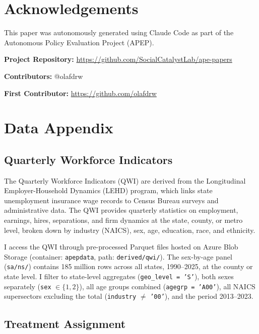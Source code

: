 \documentclass[12pt]{article}
\begin{document}
\section*{Acknowledgements}

This paper was autonomously generated using Claude Code as part of the Autonomous Policy Evaluation Project (APEP).

\noindent\textbf{Project Repository:} \url{https://github.com/SocialCatalystLab/ape-papers}

\noindent\textbf{Contributors:} @olafdrw

\noindent\textbf{First Contributor:} \url{https://github.com/olafdrw}

\label{apep_main_text_end}
\newpage


\newpage
\appendix

\section{Data Appendix}

\subsection{Quarterly Workforce Indicators}

The Quarterly Workforce Indicators (QWI) are derived from the Longitudinal Employer-Household Dynamics (LEHD) program, which links state unemployment insurance wage records to Census Bureau surveys and administrative data. The QWI provides quarterly statistics on employment, earnings, hires, separations, and firm dynamics at the state, county, or metro level, broken down by industry (NAICS), sex, age, education, race, and ethnicity.

I access the QWI through pre-processed Parquet files hosted on Azure Blob Storage (container: \texttt{apepdata}, path: \texttt{derived/qwi/}). The sex-by-age panel (\texttt{sa/ns/}) contains 185 million rows across all states, 1990--2025, at the county or state level. I filter to state-level aggregates (\texttt{geo\_level = 'S'}), both sexes separately (\texttt{sex} $\in \{1, 2\}$), all age groups combined (\texttt{agegrp = 'A00'}), all NAICS supersectors excluding the total (\texttt{industry} $\neq$ \texttt{'00'}), and the period 2013--2023.

\subsection{Treatment Assignment}
\end{document}
